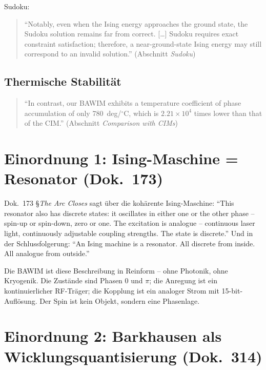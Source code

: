 Sudoku:
\begin{quote}\QM
\enquote{Notably, even when the Ising energy approaches the ground state,
the Sudoku solution remains far from correct. [\ldots] Sudoku requires
exact constraint satisfaction; therefore, a near-ground-state Ising energy
may still correspond to an invalid solution.} (Abschnitt \emph{Sudoku})
\end{quote}

\subsection{Thermische Stabilität}

\begin{quote}\QM
\enquote{In contrast, our BAWIM exhibits a temperature coefficient of phase
accumulation of only 780~deg/$^\circ$C, which is $2.21\times10^4$ times
lower than that of the CIM.} (Abschnitt \emph{Comparison with CIMs})
\end{quote}

\section{Einordnung 1: Ising-Maschine = Resonator (Dok.~173)}

Dok.~173 §\emph{The Arc Closes} sagt über die kohärente Ising-Maschine:
\enquote{This resonator also has discrete states: it oscillates in either one
or the other phase -- spin-up or spin-down, zero or one. The excitation is
analogue -- continuous laser light, continuously adjustable coupling
strengths. The state is discrete.} Und in der Schlussfolgerung:
\enquote{An Ising machine is a resonator. All discrete from inside. All
analogue from outside.}

Die BAWIM ist diese Beschreibung in Reinform -- ohne Photonik, ohne
Kryogenik. Die Zustände sind Phasen 0 und $\pi$; die Anregung ist ein
kontinuierlicher RF-Träger; die Kopplung ist ein analoger Strom mit
15-bit-Auflösung. Der Spin ist kein Objekt, sondern eine Phasenlage. \SM

\section{Einordnung 2: Barkhausen als Wicklungsquantisierung (Dok.~314)}

